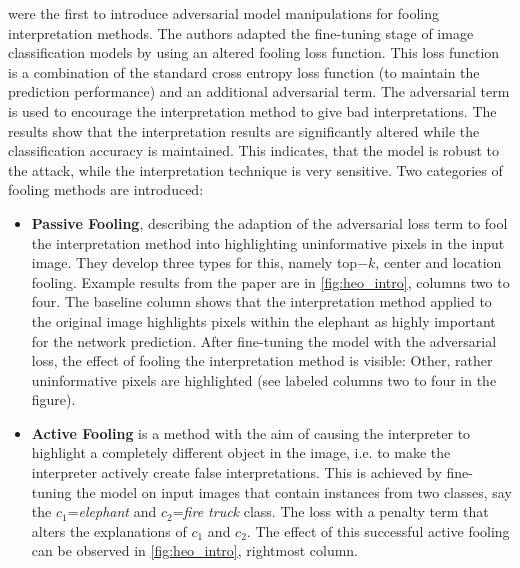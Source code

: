 \newline
\cite{fooling_nn_interpreters} were the first to introduce adversarial model manipulations for fooling interpretation methods. The authors adapted the fine-tuning stage of image classification models by using an altered fooling loss function. This loss function is a combination of the standard cross entropy loss function (to maintain the prediction performance) and an additional adversarial term. The adversarial term is used to encourage the interpretation method to give bad interpretations. The results show that the interpretation results are significantly altered while the classification accuracy is maintained. 
This indicates, that the model is robust to the attack, while the interpretation technique is very sensitive. 
Two categories of fooling methods are introduced: 
\begin{itemize}
    \item \textbf{Passive Fooling}, describing the adaption of the adversarial loss term to fool the interpretation method into highlighting uninformative pixels in the input image. They develop three types for this, namely top$-k$, center and location fooling. Example results from the paper are in \autoref{fig:heo_intro}, columns two to four. The baseline column shows that the interpretation method applied to the original image highlights pixels within the elephant as highly important for the network prediction. After fine-tuning the model with the adversarial loss, the effect of fooling the interpretation method is visible: Other, rather uninformative pixels are highlighted (see labeled columns two to four in the figure). 
    \item \textbf{Active Fooling} is a method with the aim of causing the interpreter to highlight a completely different object in the image, i.e. to make the interpreter actively create false interpretations. This is achieved by fine-tuning the model on input images that contain instances from two classes, say the $c_1$=\textit{elephant} and $c_2$=\textit{fire truck} class. The loss with a penalty term that alters the explanations of $c_1$ and $c_2$. The effect of this successful active fooling can be observed in \autoref{fig:heo_intro}, rightmost column.
\end{itemize}

